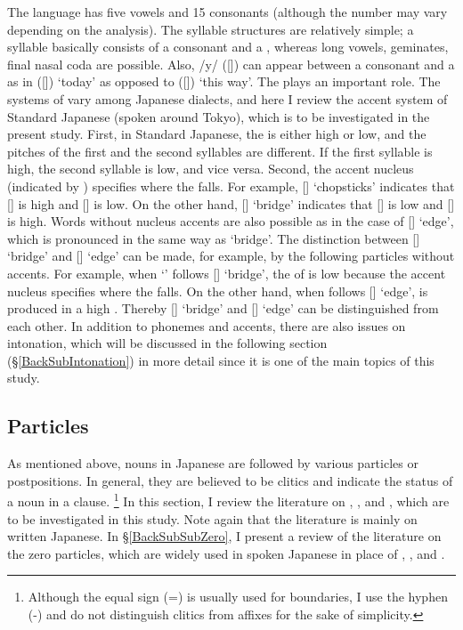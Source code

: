The language has five vowels and 15 consonants (although the number may vary depending on the analysis).
The syllable structures are relatively simple;
a syllable basically consists of a consonant and a ,
whereas long vowels, geminates, final nasal coda are possible.
Also, /y/ ([]) can appear between a consonant and a 
as in  ([]) `today' as opposed to  ([]) `this way'.
The  plays an important role.
The systems of  vary among Japanese dialects,
and here I review the accent system of Standard Japanese (spoken around Tokyo),
which is to be investigated in the present study.
First, in Standard Japanese,
the  is either high or low, and
the pitches of the first and the second syllables are different.
If the first syllable is high, the second syllable is low,
and vice versa.
Second, the accent nucleus (indicated by {\tcorner}) specifies where the  falls.
For example,
[] `chopsticks' indicates that [] is high and [] is low.
On the other hand, [] `bridge' indicates that
[] is low and [] is high.
Words without nucleus accents are also possible as in the case of [] `edge',
which is pronounced in the same way as `bridge'.
The distinction between [] `bridge' and [] `edge' can be made, for example, by the following particles without accents.
For example, when  `' follows [] `bridge', the  of  is low
because the accent nucleus specifies where the  falls.
On the other hand, when  follows [] `edge',  is produced in a high .
Thereby [] `bridge' and [] `edge' can be distinguished from each other.
In addition to phonemes and  accents,
there are also issues on intonation, which will be discussed in the following section (\S \ref{BackSubIntonation}) in more detail since it is one of the main topics of this study.


\subsection{Particles}\label{BackSubSecParticles}

As mentioned above,
nouns in Japanese are followed by various particles or postpositions.
In general, they are believed to be clitics and indicate the status of a noun in a clause.%
 \footnote{
 Although the equal sign (=) is usually used for  boundaries,
 I use the hyphen (-) and do not distinguish clitics from affixes for the sake of simplicity.
 }
In this section, I review the literature on , , and ,
which are to be investigated in this study.
Note again that the literature is mainly on written Japanese.
In \S \ref{BackSubSubZero},
I present a review of the literature on the zero particles,
which are widely used in spoken Japanese in place of , , and .

